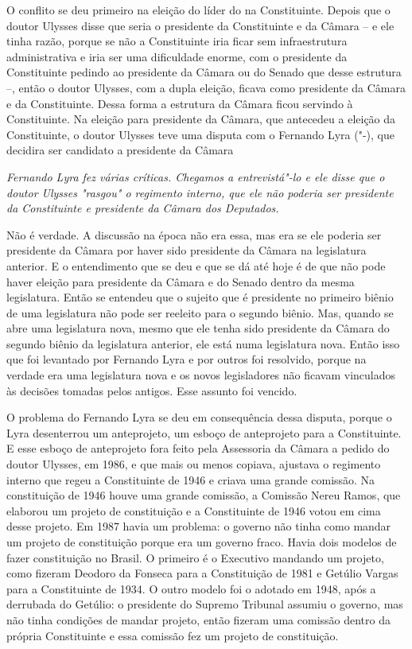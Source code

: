 O conflito se deu primeiro na eleição do líder do  na Constituinte.
Depois que o doutor Ulysses disse que seria o presidente da Constituinte
e da Câmara -- e ele tinha razão, porque se não a Constituinte iria
ficar sem infraestrutura administrativa e iria ser uma dificuldade
enorme, com o presidente da Constituinte pedindo ao presidente da Câmara
ou do Senado que desse estrutura --, então o doutor Ulysses, com a dupla
eleição, ficava como presidente da Câmara e da Constituinte. Dessa forma
a estrutura da Câmara ficou servindo à Constituinte. Na eleição para
presidente da Câmara, que antecedeu a eleição da Constituinte, o doutor
Ulysses teve uma disputa com o Fernando Lyra ("-), que decidira ser
candidato a presidente da Câmara

\medskip

\emph{Fernando Lyra fez várias críticas. Chegamos a entrevistá"-lo e
ele disse que o doutor Ulysses "rasgou" o regimento interno, que ele não
poderia ser presidente da Constituinte e presidente da Câmara dos
Deputados.}

Não é verdade. A discussão na época não era essa, mas
era se ele poderia ser presidente da Câmara por haver sido presidente da
Câmara na legislatura anterior. E o entendimento que se deu e que se dá
até hoje é de que não pode haver eleição para presidente da Câmara e do
Senado dentro da mesma legislatura. Então se entendeu que o sujeito que
é presidente no primeiro biênio de uma legislatura não pode ser reeleito
para o segundo biênio. Mas, quando se abre uma legislatura nova, mesmo
que ele tenha sido presidente da Câmara do segundo biênio da legislatura
anterior, ele está numa legislatura nova. Então isso que foi levantado
por Fernando Lyra e por outros foi resolvido, porque na verdade era uma
legislatura nova e os novos legisladores não ficavam vinculados às
decisões tomadas pelos antigos. Esse assunto foi vencido.

O problema do Fernando Lyra se deu em consequência dessa disputa, porque
o Lyra desenterrou um anteprojeto, um esboço de anteprojeto para a
Constituinte. E esse esboço de anteprojeto fora feito pela Assessoria da
Câmara a pedido do doutor Ulysses, em 1986, e que mais ou menos copiava,
ajustava o regimento interno que regeu a Constituinte de 1946 e criava
uma grande comissão. Na constituição de 1946 houve uma grande comissão,
a Comissão Nereu Ramos, que elaborou um projeto de constituição e a
Constituinte de 1946 votou em cima desse projeto. Em 1987 havia um
problema: o governo não tinha como mandar um projeto de constituição
porque era um governo fraco. Havia dois modelos de fazer constituição no
Brasil. O primeiro é o Executivo mandando um projeto, como fizeram
Deodoro da Fonseca para a Constituição de 1981 e Getúlio Vargas para a
Constituinte de 1934. O outro modelo foi o adotado em 1948, após a
derrubada do Getúlio: o presidente do Supremo Tribunal assumiu o
governo, mas não tinha condições de mandar projeto, então fizeram uma
comissão dentro da própria Constituinte e essa comissão fez um projeto
de constituição.

